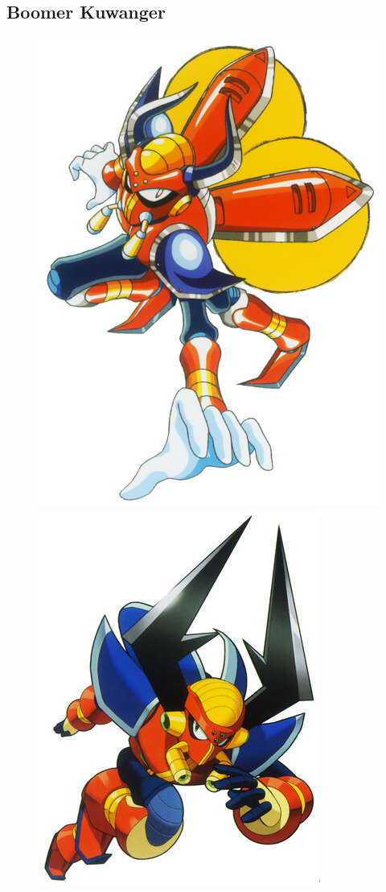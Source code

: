 \subsection{Boomer Kuwanger}\label{boss:Boomer_Kuwanger}
\begin{figure}[htp]
	\centering
	\includegraphics[height=\portraitsize]{figures/X1/Boomer_kuwanger/Boomer_kuwanger.jpg}
	\includegraphics[height=\portraitsize]{figures/X1/Boomer_kuwanger/MHXBoomerKuwanger.jpg}

\end{figure}
